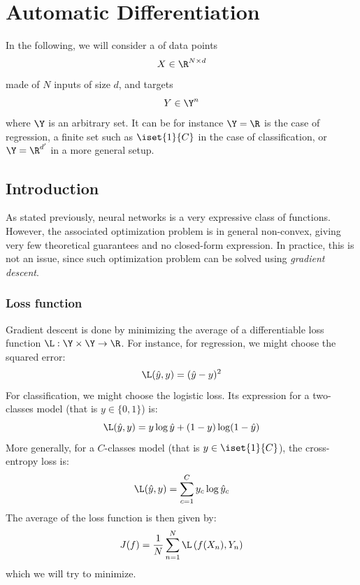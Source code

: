 \section{Automatic Differentiation}
In the following, we will consider a  of data points
\begin{equation*}
    X\in\R^{N\times d}
\end{equation*}
made of $N$ inputs of size $d$, and targets
\begin{equation*}
    Y\in\Y^n
\end{equation*}
where $\Y$ is an arbitrary set. It can be for instance $\Y=\R$ is the case of regression, a finite set such as $\iset{1}{C}$ in the case of classification, or $\Y=\R^{d'}$ in a more general setup.

\subsection{Introduction}
As stated previously, neural networks is a very expressive class of functions. However, the associated optimization problem is in general non-convex, giving very few theoretical guarantees and no closed-form expression. In practice, this is not an issue, since such optimization problem can be solved using \emph{gradient descent}.
\subsubsection{Loss function}

Gradient descent is done by minimizing the average of a differentiable loss function $\L:\Y\times\Y\to\R$. For instance, for regression, we might choose the squared error:
\begin{equation*}
    \L(\hat{y}, y) = (\hat{y}-y)^2
\end{equation*}
For classification, we might choose the logistic loss. Its expression for a two-classes model (that is $y\in\{0, 1\}$) is:
\begin{equation*}
    \L(\hat{y}, y) = y\log\hat{y} + (1-y)\log(1-\hat{y})
\end{equation*}
More generally, for a $C$-classes model (that is $y\in\iset{1}{C}$), the cross-entropy loss is:
\begin{equation*}
    \L(\hat{y}, y) =  \sum_{c=1}^C y_c \log \hat{y}_c
\end{equation*}
The average of the loss function is then given by:
\begin{equation*}
    J(f) = \frac{1}{N}\sum_{n=1}^N \L\left(f(X_n), Y_n\right)
\end{equation*}
which we will try to minimize.

